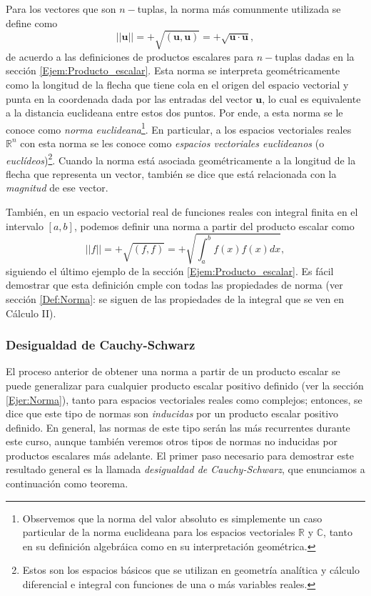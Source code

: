 \documentclass[12pt]{article}
\begin{document}
Para los vectores que son $n-$tuplas, la norma más comunmente utilizada se define como $$||\mathbf{u}|| = +\sqrt{(\mathbf{u},\mathbf{u})} = +\sqrt{\mathbf{u}\cdot\mathbf{u}},$$ \noindent de acuerdo a las definiciones de productos escalares para $n-$tuplas dadas en la sección \ref{Ejem:Producto_escalar}. Esta norma se interpreta geométricamente como la longitud de la flecha que tiene cola en el origen del espacio vectorial y punta en la coordenada dada por las entradas del vector $\mathbf{u}$, lo cual es equivalente a la distancia euclideana entre estos dos puntos. Por ende, a esta norma se le conoce como \emph{norma euclideana}\footnote{Observemos que la norma del valor absoluto es simplemente un caso particular de la norma euclideana para los espacios vectoriales $\mathbb{R}$ y $\mathbb{C}$, tanto en su definición algebráica como en su interpretación geométrica.}. En particular, a los espacios vectoriales reales $\mathbb{R}^n$ con esta norma se les conoce como \emph{espacios vectoriales euclideanos} (o \emph{euclídeos})\footnote{Estos son los espacios básicos que se utilizan en geometría analítica y cálculo diferencial e integral con funciones de una o más variables reales.}. Cuando la norma está asociada geométricamente a la longitud de la flecha que representa un vector, también se dice que está relacionada con la \emph{magnitud} de ese vector.

\vspace{3mm}

También, en un espacio vectorial real de funciones reales con integral finita en el intervalo $[a,b]$, podemos definir una norma a partir del producto escalar como $$||f|| = +\sqrt{(f,f)} = +\sqrt{\int_a^b f(x)f(x) dx},$$ \noindent siguiendo el último ejemplo de la sección \ref{Ejem:Producto_escalar}. Es fácil demostrar que esta definición cmple con todas las propiedades de norma (ver sección \ref{Def:Norma}: se siguen de las propiedades de la integral que se ven en Cálculo II). 

\subsubsection{Desigualdad de Cauchy-Schwarz} \label{Teo:Cauchy-Schwarz} 

El proceso anterior de obtener una norma a partir de un producto escalar se puede generalizar para cualquier producto escalar positivo definido (ver la sección \ref{Ejer:Norma}), tanto para espacios vectoriales reales como complejos; entonces, se dice que este tipo de normas son \emph{inducidas} por un producto escalar positivo definido. En general, las normas de este tipo serán las más recurrentes durante este curso, aunque también veremos otros tipos de normas no inducidas por productos escalares más adelante. El primer paso necesario para demostrar este resultado general es la llamada \emph{desigualdad de Cauchy-Schwarz}, que enunciamos a continuación como teorema.
\end{document}
